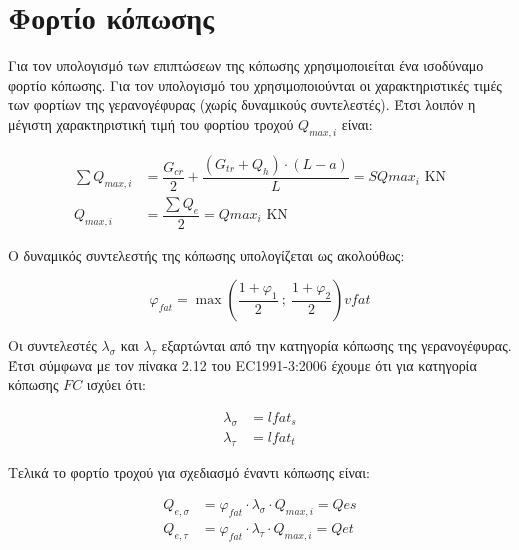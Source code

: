 \section{Φορτίο κόπωσης}

Για τον υπολογισμό των επιπτώσεων της κόπωσης χρησιμοποιείται ένα ισοδύναμο φορτίο κόπωσης. Για τον
υπολογισμό του χρησιμοποιούνται οι χαρακτηριστικές τιμές των φορτίων της γερανογέφυρας (χωρίς
δυναμικούς συντελεστές). Έτσι λοιπόν η μέγιστη χαρακτηριστική τιμή του φορτίου τροχού  $Q_{max,i}$
είναι:

\begin{align*}
    \sum{Q_{max,i}} &= \dfrac{G_{cr}}{2} + \dfrac{(G_{tr} + Q_h) \cdot (L - a)}{L} = {{ SQmax_i }} \text{ KN} \\
    Q_{max,i}       &= \dfrac{\displaystyle\sum{Q_e}}{2}                           = {{ Qmax_i }}  \text{ KN}
\end{align*}

Ο δυναμικός συντελεστής της κόπωσης υπολογίζεται ως ακολούθως:

\begin{equation*}
    φ_{fat} = \max \left( \dfrac{1+φ_1}{2}\ ; \ \dfrac{1+φ_2}{2} \right) {{ vfat }}
\end{equation*}

Οι συντελεστές $λ_σ$ και $λ_τ$ εξαρτώνται από την κατηγορία κόπωσης της γερανογέφυρας. Έτσι σύμφωνα
με τον πίνακα 2.12 του EC1991-3:2006 έχουμε ότι για κατηγορία κόπωσης ${{ FC }}$ ισχύει
ότι:

\begin{align*}
    λ_σ &= {{ lfat_s }}\\
    λ_τ &= {{ lfat_t }}
\end{align*}

Τελικά το φορτίο τροχού για σχεδιασμό έναντι κόπωσης είναι:

\begin{align*}
    Q_{e,σ} &= φ_{fat} \cdot λ_σ \cdot Q_{max,i} = {{ Qes }}\\
    Q_{e,τ} &= φ_{fat} \cdot λ_τ \cdot Q_{max,i} = {{ Qet }}
\end{align*}
